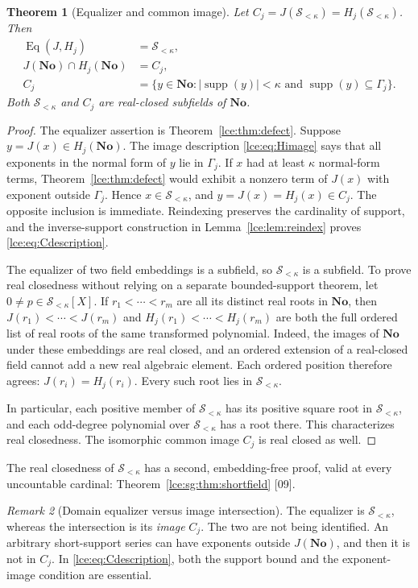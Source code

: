 \documentclass[11pt,letterpaper]{article}
\numberwithin{equation}{section}
\newtheorem{theorem}{Theorem}[section]
\theoremstyle{definition}
\theoremstyle{remark}
\newtheorem{remark}[theorem]{Remark}
\newcommand{\No}{\mathbf{No}}
\newcommand{\supp}{\operatorname{supp}}
\newcommand{\Sk}{\mathscr S_{<\kappa}}
\newcommand{\Gam}{\Gamma_j}
\newcommand{\Common}{C_j}
\newcommand{\abs}[1]{\lvert#1\rvert}
\newcommand{\thref}[1]{Theorem~\ref{#1}}
\newcommand{\leref}[1]{Lemma~\ref{#1}}
\newcommand{\src}[1]{\textup{\textsf{\small[#1]}}}%
\begin{document}
\begin{theorem}[Equalizer and common image]\label{lce:thm:intersection}
Let $\Common=J(\Sk)=H_j(\Sk)$. Then
\begin{align}
 \operatorname{Eq}(J,H_j)&=\Sk,\label{lce:eq:equalizer}\\
 J(\No)\cap H_j(\No)&=\Common,\label{lce:eq:intersection}\\
 \Common&=\{y\in\No:\abs{\supp(y)}<\kappa
                   \text{ and }\supp(y)\subseteq\Gam\}.\label{lce:eq:Cdescription}
\end{align}
Both $\Sk$ and $\Common$ are real-closed subfields of $\No$.
\end{theorem}
\begin{proof}
The equalizer assertion is \thref{lce:thm:defect}. Suppose
$y=J(x)\in H_j(\No)$. The image description \eqref{lce:eq:Himage} says that
all exponents in the normal form of $y$ lie in $\Gam$. If $x$ had at
least $\kappa$ normal-form terms, \thref{lce:thm:defect} would exhibit a
nonzero term of $J(x)$ with exponent outside $\Gam$. Hence $x\in\Sk$,
and $y=J(x)=H_j(x)\in\Common$. The opposite inclusion is immediate.
Reindexing preserves the cardinality of support, and the inverse-support
construction in \leref{lce:lem:reindex} proves \eqref{lce:eq:Cdescription}.

The equalizer of two field embeddings is a subfield, so $\Sk$ is a
subfield. To prove real closedness without relying on a separate
bounded-support theorem, let $0\ne p\in\Sk[X]$. If $r_1<\cdots<r_m$ are all
its distinct real roots in $\No$, then $J(r_1)<\cdots<J(r_m)$ and
$H_j(r_1)<\cdots<H_j(r_m)$ are both the full ordered list of real roots
of the same transformed polynomial. Indeed, the images of $\No$ under
these embeddings are real closed, and an ordered extension of a real-closed
field cannot add a new real algebraic element. Each ordered position
therefore agrees: $J(r_i)=H_j(r_i)$. Every such root lies in $\Sk$.

In particular, each positive member of $\Sk$ has its positive square root
in $\Sk$, and each odd-degree polynomial over $\Sk$ has a root there.
This characterizes real closedness. The isomorphic common image
$\Common$ is real closed as well.
\end{proof}
The real closedness of $\Sk$ has a second, embedding-free proof, valid at
every uncountable cardinal: \thref{lce:sg:thm:shortfield} \src{09}.

\begin{remark}[Domain equalizer versus image intersection]\label{lce:rem:twocommon}
The equalizer is $\Sk$, whereas the intersection is its \emph{image}
$\Common$. The two are not being identified. An arbitrary short-support
series can have exponents outside $J(\No)$, and then it is not in
$\Common$. In \eqref{lce:eq:Cdescription}, both the support bound and the
exponent-image condition are essential.
\end{remark}
\end{document}
